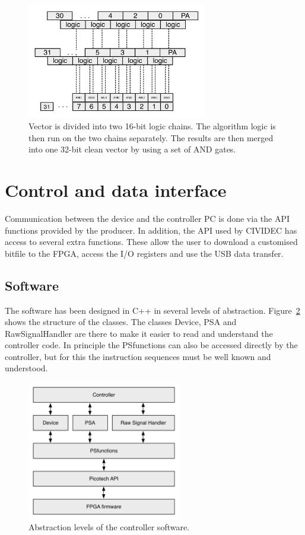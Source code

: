 \begin{figure}[!t]
\centering
\includegraphics[width=0.7\textwidth]{05_current_monitoring/plots/algobase}
\caption{Vector is divided into two 16-bit logic chains. The algorithm logic is then run on the two chains separately. The results are then merged into one 32-bit clean vector by using a set of AND gates.}
\label{fig:algobase}
\end{figure}


\section{Control and data interface}
Communication between the device and the controller PC is done via the API functions provided by the producer. In addition, the API used by CIVIDEC has access to several extra functions. These allow the user to download a customised bitfile to the FPGA, access the I/O registers and use the USB data transfer.

\subsection{Software}
The software has been designed in C++ in several levels of abstraction. Figure~\ref{fig:controller} shows the structure of the classes. The classes Device, PSA and RawSignalHandler are there to make it easier to read and understand the controller code. In principle the PSfunctions can also be accessed directly by the controller, but for this the instruction sequences must be well known and understood. 

\begin{figure}[!t]
\centering
\includegraphics[width=0.6\textwidth]{05_current_monitoring/plots/controller}
\caption{Abstraction levels of the controller software.}
\label{fig:controller}
\end{figure}

